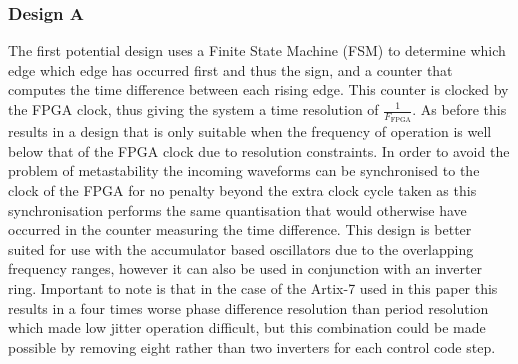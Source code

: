 \documentclass[conference]{IEEEtran}
\begin{document}
\subsubsection*{Design A}
The first potential design uses a Finite State Machine (FSM) to determine which edge which edge has occurred first and thus the sign, and a counter that computes the time difference between each rising edge. This counter is clocked by the FPGA clock, thus giving the system a time resolution of $\frac{1}{F_{\textrm{FPGA}}}$. As before this results in a design that is only suitable when the frequency of operation is well below that of the FPGA clock due to resolution constraints. In order to avoid the problem of metastability the incoming waveforms can be synchronised to the clock of the FPGA for no penalty beyond the extra clock cycle taken as this synchronisation performs the same quantisation that would otherwise have occurred in the counter measuring the time difference. This design is better suited for use with the accumulator based oscillators due to the overlapping frequency ranges, however it can also be used in conjunction with an inverter ring. Important to note is that in the case of the Artix-7 used in this paper this results in a four times worse phase difference resolution than period resolution which made low jitter operation difficult, but this combination could be made possible by removing eight rather than two inverters for each control code step. %
\end{document}

